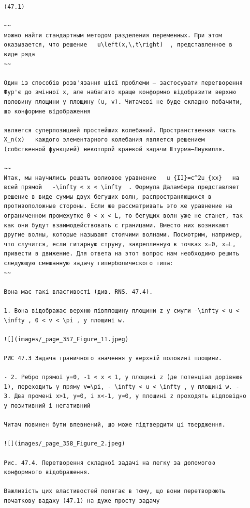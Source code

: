 \documentclass[
  ukrainian,
]{article}
\begin{document}
\begin{verbatim}
(47.1) 

~~
можно найти стандартным методом разделения переменных. При этом оказывается, что решение   u\left(x,\,t\right)  , представленное в виде ряда
~~

Один із способів розв'язання цієї проблеми — застосувати перетворення Фур'є до змінної x, але набагато краще конформно відобразити верхню половину площини у площину (u, v). Читачеві не буде складно побачити, що конформне відображення

является суперпозицией простейших колебаний. Пространственная часть   X_n(x)   каждого элементарного колебания является решением (собственной функцией) некоторой краевой задачи Штурма—Лиувилля.

~~
Итак, мы научились решать волиовое уравнение   u_{II}=c^2u_{xx}   на всей прямой   -\infty < x < \infty  . Формула Даламбера представляет решение в виде суммы двух бегущих волн, распространяющихся в противоположные стороны. Если же рассматривать это же уравнение на ограниченном промежутке 0 < x < L, то бегущих волн уже не станет, так как они будут взаимодействовать с границами. Вместо них возникают другие волны, которые называют стоячими волнами. Посмотрим, например, что случится, если гитарную струну, закрепленную в точках x=0, x=L, привести в движение. Для ответа на этот вопрос нам необходимо решить следующую смешанную задачу гиперболического типа:
~~

Вона має такі властивості (див. RNS. 47.4).

1. Вона відображає верхню півплощину площини z у смуги -\infty < u < \infty , 0 < v < \pi , у площині w.

![](images/_page_357_Figure_11.jpeg)

РИС 47.3 Задача граничного значення у верхній половині площини.

- 2. Ребро прямої y=0, -1 < x < 1, у площині z (де потенціал дорівнює 1), переходить у пряму v=\pi, - \infty < u < \infty , у площині w. - 3. Два промені x>1, y=0, і x<-1, y=0, у площині z проходять відповідно у позитивний і негативний

Читач повинен бути впевнений, що може підтвердити ці твердження.

![](images/_page_358_Figure_2.jpeg)

Рис. 47.4. Перетворення складної задачі на легку за допомогою конформного відображення.

Важливість цих властивостей полягає в тому, що вони перетворюють початкову вадаху (47.1) на дуже просту задачу


\end{verbatim}
\end{document}

